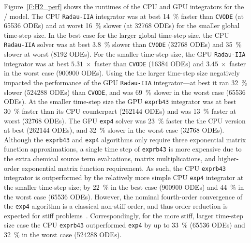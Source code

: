 \documentclass[preprint]{elsarticle}
\begin{document}
Figure~\ref{F:H2_perf} shows the runtimes of the CPU and GPU integrators for the \slash{} model.
The CPU \texttt{Radau-IIA} integrator was at best \SI{14}{\percent} faster than \texttt{CVODE} (at \num{65536} ODEs) and at worst \SI{16}{\percent} slower (at \num{32768} ODEs) for the smaller global time-step size.
In the best case for the larger global time-step size, the CPU \texttt{Radau-IIA} solver was at best \SI{3.8}{\percent} slower than \texttt{CVODE} (\num{32768} ODEs) and \SI{35}{\percent} slower at worst (\num{8192} ODEs).
For the smaller time-step size, the GPU \texttt{Radau-IIA} integrator was at best $\SI{5.31}{\times}$ faster than \texttt{CVODE} (\num{16384} ODEs) and $\SI{3.45}{\times}$ faster in the worst case (\num{900900} ODEs).
Using the the larger time-step size negatively impacted the performance of the GPU \texttt{Radau-IIA} integrator---at best it ran \SI{32}{\percent} slower (\num{524288} ODEs) than \texttt{CVODE}, and was \SI{69}{\percent} slower in the worst case (\num{65536} ODEs).
At the smaller time-step size the GPU \texttt{exprb43} integrator was at best \SI{30}{\percent} faster than its CPU counterpart (\num{262144} ODEs) and was \SI{13}{\percent} faster at worst (\num{32768} ODEs). 
The GPU \texttt{exp4} solver was \SI{23}{\percent} faster the the CPU version at best (\num{262144} ODEs), and \SI{32}{\percent} slower in the worst case (\num{32768} ODEs).
Although the \texttt{exprb43} and \texttt{exp4} algorithms only require three exponential matrix function approximations, a single time step of \texttt{exprb43} is more expensive due to the extra chemical source term evaluations, matrix multiplications, and higher-order exponential matrix function requirement.
As such, the CPU \texttt{exprb43} integrator is outperformed by the relatively more simple CPU \texttt{exp4} integrator at the smaller time-step size; by \SI{22}{\percent} in the best case (\num{900900} ODEs) and \SI{44}{\percent} in the worst case (\num{65536} ODEs).
However, the nominal fourth-order convergence of the \texttt{exp4} algorithm is a classical non-stiff order, and thus order reduction is expected for stiff problems~\cite{ANU:7701740,Bisetti:2012jw}.
Correspondingly, for the more stiff, larger time-step size case the CPU \texttt{exprb43} outperformed \texttt{exp4} by up to \SI{33}{\percent} (\num{65536} ODEs) and \SI{32}{\percent} in the worst case (\num{524288} ODEs).
\end{document}
